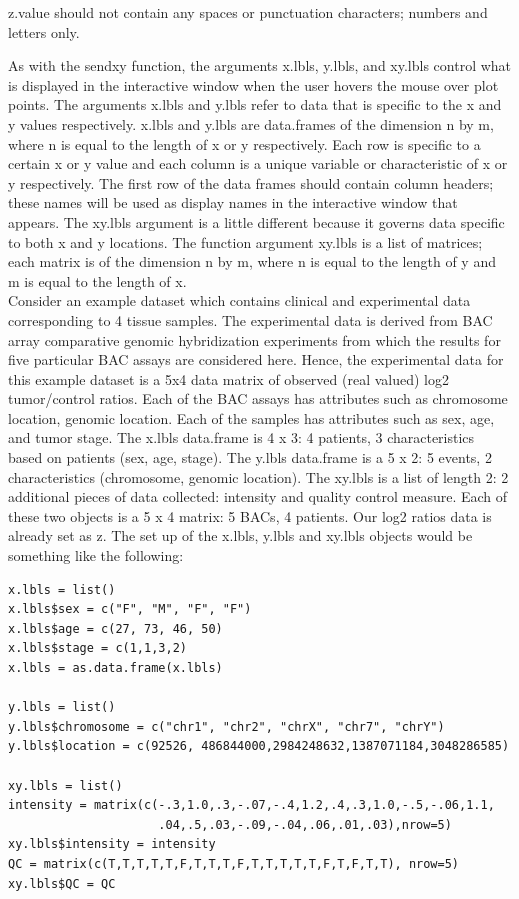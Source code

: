 \documentclass[]{article}
\begin{document}
 z.value should not contain any spaces or punctuation characters; numbers and letters only.

\indent As with the sendxy function, the arguments x.lbls, y.lbls, and xy.lbls control what is displayed in the interactive window when the user hovers the mouse over plot points. The arguments x.lbls and y.lbls refer to data that is specific to the x and y values respectively. x.lbls and y.lbls are data.frames of the dimension n by m, where n is equal to the length of x or y respectively. Each row is specific to a certain x or y value and each column is a unique variable or characteristic of x or y respectively.  The first row of the data frames should contain column headers; these names will be used as display names in the interactive window that appears. The xy.lbls argument is a little different because it governs data specific to both x and y locations. The function argument xy.lbls is a list of matrices; each matrix is of the dimension n by m, where n is equal to the length of y and m is equal to the length of x.\\ 

\indent Consider an example dataset which contains clinical and experimental data corresponding to 4 tissue samples. The experimental data is derived from BAC array comparative genomic hybridization experiments from which the results for five particular BAC assays are considered here. Hence, the experimental data for this example dataset is a 5x4 data matrix of observed (real valued) log2 tumor/control ratios. Each of the BAC assays has attributes such as chromosome location, genomic location. Each of the samples has attributes such as sex, age, and tumor stage. The x.lbls data.frame is 4 x 3: 4 patients, 3 characteristics based on patients (sex, age, stage). The y.lbls data.frame is a 5 x 2: 5 events, 2 characteristics (chromosome, genomic location).  The xy.lbls is a list of length 2: 2 additional pieces of data collected: intensity and quality control measure. Each of these two objects is a 5 x 4 matrix: 5 BACs, 4 patients. Our log2 ratios data is already set as z. The set up of the x.lbls, y.lbls and xy.lbls objects would be something like the following:

\begin{verbatim}
x.lbls = list()
x.lbls$sex = c("F", "M", "F", "F")
x.lbls$age = c(27, 73, 46, 50)
x.lbls$stage = c(1,1,3,2)
x.lbls = as.data.frame(x.lbls)

y.lbls = list()
y.lbls$chromosome = c("chr1", "chr2", "chrX", "chr7", "chrY")
y.lbls$location = c(92526, 486844000,2984248632,1387071184,3048286585)

xy.lbls = list()
intensity = matrix(c(-.3,1.0,.3,-.07,-.4,1.2,.4,.3,1.0,-.5,-.06,1.1,
                     .04,.5,.03,-.09,-.04,.06,.01,.03),nrow=5)
xy.lbls$intensity = intensity
QC = matrix(c(T,T,T,T,T,F,T,T,T,F,T,T,T,T,T,F,T,F,T,T), nrow=5)
xy.lbls$QC = QC

\end{verbatim}
\end{document}

